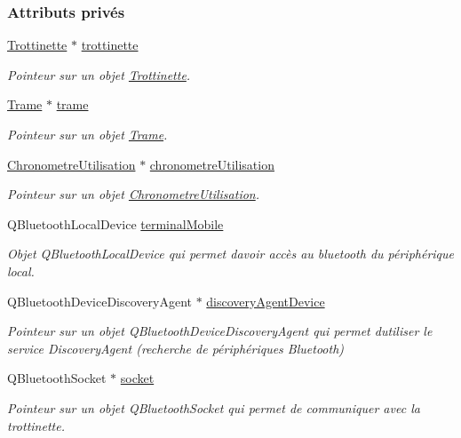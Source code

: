 \subsubsection*{Attributs privés}
\begin{DoxyCompactItemize}
\item 
\hyperlink{class_trottinette}{Trottinette} $\ast$ \hyperlink{class_peripherique_local_aa110b2c3292270553f592362e45f710b}{trottinette}
\begin{DoxyCompactList}\small\item\em Pointeur sur un objet \hyperlink{class_trottinette}{Trottinette}. \end{DoxyCompactList}\item 
\hyperlink{class_trame}{Trame} $\ast$ \hyperlink{class_peripherique_local_a3c96dbda4eacf235c2bb0cabaa742122}{trame}
\begin{DoxyCompactList}\small\item\em Pointeur sur un objet \hyperlink{class_trame}{Trame}. \end{DoxyCompactList}\item 
\hyperlink{class_chronometre_utilisation}{Chronometre\+Utilisation} $\ast$ \hyperlink{class_peripherique_local_a89e0515901920b03e83066cf306f7f14}{chronometre\+Utilisation}
\begin{DoxyCompactList}\small\item\em Pointeur sur un objet \hyperlink{class_chronometre_utilisation}{Chronometre\+Utilisation}. \end{DoxyCompactList}\item 
Q\+Bluetooth\+Local\+Device \hyperlink{class_peripherique_local_a515044c46ba91db8d0b29362226860aa}{terminal\+Mobile}
\begin{DoxyCompactList}\small\item\em Objet Q\+Bluetooth\+Local\+Device qui permet d\textquotesingle{}avoir accès au bluetooth du périphérique local. \end{DoxyCompactList}\item 
Q\+Bluetooth\+Device\+Discovery\+Agent $\ast$ \hyperlink{class_peripherique_local_a9e398b7dd89a20b1bee67b8c3467da69}{discovery\+Agent\+Device}
\begin{DoxyCompactList}\small\item\em Pointeur sur un objet Q\+Bluetooth\+Device\+Discovery\+Agent qui permet d\textquotesingle{}utiliser le service Discovery\+Agent (recherche de périphériques Bluetooth) \end{DoxyCompactList}\item 
Q\+Bluetooth\+Socket $\ast$ \hyperlink{class_peripherique_local_a0058bf8367b4b8f907838b83a9150c07}{socket}
\begin{DoxyCompactList}\small\item\em Pointeur sur un objet Q\+Bluetooth\+Socket qui permet de communiquer avec la trottinette. \end{DoxyCompactList}\end{DoxyCompactItemize}


